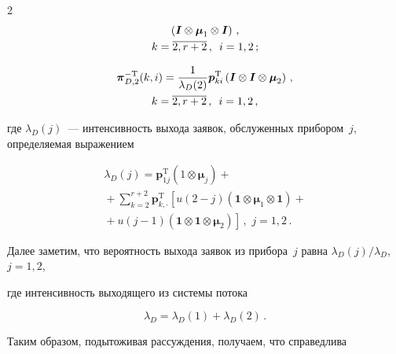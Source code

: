 \begin{multicols}{2}
\begin{multline}
\left(\boldsymbol{I}\otimes\boldsymbol{\mu}_1\otimes\boldsymbol{I}\right)\,,\\

k=\overline{2,r+2}\,,\enskip i=1,2\,;

\end{multline}

\begin{multline}

\label{eq:20}

\boldsymbol{\pi}_{D,2}^{-\mathrm{T}}(k,i)=\frac{1}{\lambda_{D}(2)}\boldsymbol{p}_{ki}^{\mathrm{T}}

\left(\boldsymbol{I}\otimes\boldsymbol{I}\otimes\boldsymbol{\mu}_2\right)\,,\\

 k=\overline{2,r+2}\,,\enskip i=1,2\,,

\end{multline}

где $\lambda_{D}(j)$~--- интенсивность выхода заявок, обслуженных прибором~$j$, определяемая выражением

\begin{multline*}

\lambda_{D}(j)=\boldsymbol{p}_{1j}^{\mathrm{T}}\left(1\otimes\boldsymbol{\mu}_j\right)+{}\\

{}+\sum\limits_{k=2}^{r+2}\boldsymbol{p}_{k,\cdot}^{\mathrm{T}}

\left[u(2-j)(\boldsymbol{1}\otimes\boldsymbol{\mu}_1\otimes\boldsymbol{1})+{}\right.\\

\left.{}+

u(j-1)(\boldsymbol{1}\otimes\boldsymbol{1}\otimes\boldsymbol{\mu}_2)\right]\,,\,\,

j=1,2\,.

\end{multline*}



Далее заметим, что вероятность выхода заявок из прибора~$j$ равна $\lambda_{D}(j)/\lambda_{D}$, $j=1,2$, 

где интенсивность выходящего из системы потока

\begin{equation*}

\lambda_D=\lambda_D(1)+\lambda_D(2)\,.

\end{equation*}



Таким образом, подытоживая рассуждения, получаем, что справедлива




\end{multicols}
